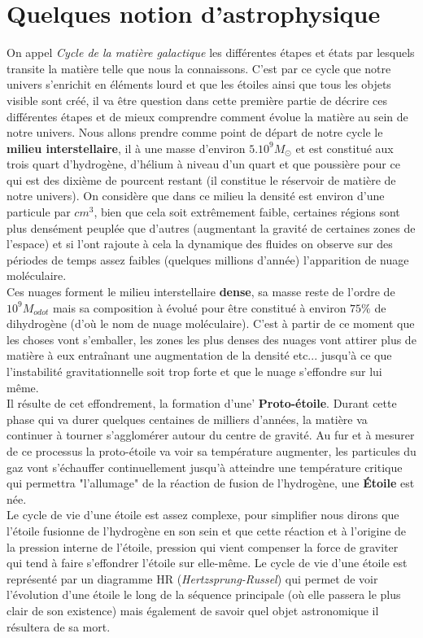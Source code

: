 \documentclass[a4paper]{rapport}
\begin{document}
\part{Quelques notion d'astrophysique}
On appel \textit{Cycle de la matière galactique} les différentes étapes et états par lesquels transite la matière telle que nous la connaissons. C'est par ce cycle que notre univers s’enrichit en éléments lourd et que les étoiles ainsi que tous les objets visible sont créé, il va être question dans cette première partie de décrire ces différentes étapes et de mieux comprendre comment évolue la matière au sein de notre univers.
\nl
Nous allons prendre comme point de départ de notre cycle le \textbf{milieu interstellaire}, il à une masse d'environ $5.10^{9}M_{\odot}$ et est constitué aux trois quart d'hydrogène, d'hélium à niveau d'un quart et que poussière pour ce qui est des dixième de pourcent restant (il constitue le réservoir de matière de notre univers). On considère que dans ce milieu la densité est environ d'une particule par $cm^3$, bien que cela soit extrêmement faible, certaines régions sont plus densément peuplée que d'autres (augmentant la gravité de certaines zones de l'espace) et si l'ont rajoute à cela la dynamique des fluides on observe sur des périodes de temps assez faibles (quelques millions d'année) l'apparition de nuage moléculaire.\\ Ces nuages forment le milieu interstellaire \textbf{dense}, sa masse reste de l'ordre de $10^{9}M_{odot}$ mais sa composition à évolué pour être constitué à environ $75\%$ de dihydrogène (d’où le nom de nuage moléculaire). C'est à partir de ce moment que les choses vont s'emballer, les zones les plus denses des nuages vont attirer plus de matière à eux entraînant une augmentation de la densité etc... jusqu’à ce que l'instabilité gravitationnelle soit trop forte et que le nuage s’effondre sur lui même.\\
Il résulte de cet effondrement, la formation d'une' \textbf{Proto-étoile}. Durant cette phase qui va durer quelques centaines de milliers d'années, la matière va continuer à tourner s'agglomérer autour du centre de gravité. Au fur et à mesurer de ce processus la proto-étoile va voir sa température augmenter, les particules du gaz vont s'échauffer continuellement jusqu’à atteindre une température critique qui permettra "l'allumage" de la réaction de fusion de l'hydrogène, une \textbf{Étoile} est née.\\
Le cycle de vie d'une étoile est assez complexe, pour simplifier nous dirons que l'étoile fusionne de l’hydrogène en son sein et que cette réaction et à l'origine de la pression interne de l'étoile, pression qui vient compenser la force de graviter qui tend à faire s’effondrer l'étoile sur elle-même. Le cycle de vie d'une étoile est représenté par un diagramme HR (\textit{Hertzsprung-Russel}) qui permet de voir l'évolution d'une étoile le long de la séquence principale (où elle passera le plus clair de son existence) mais également de savoir quel objet astronomique il résultera de sa mort.
\end{document}
